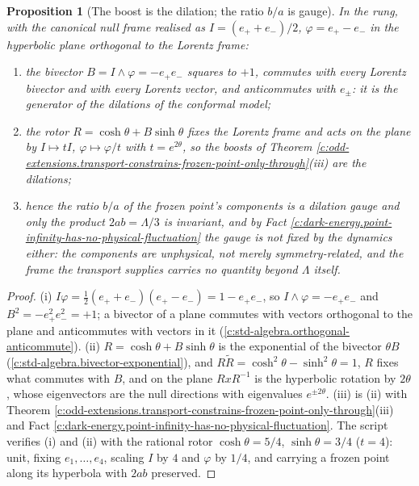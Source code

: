 \documentclass[11pt]{article}
\newtheorem{proposition}[theorem]{Proposition}
\theoremstyle{definition}
\theoremstyle{plain}
\newcommand{\changedmark}[2]{\marginpar{\raggedright\scriptsize\color{#1}#2}}
\begin{document}
\begin{proposition}[The boost is the dilation; the ratio $b/a$ is gauge]\label{c:odd-extensions.boost-dilation-ratio-gauge}
\changedmark{gray}{reworded}
In the rung, with the canonical null frame realised as $I = (e_{+} + e_{-})/2$, $\varphi = e_{+} - e_{-}$ in the hyperbolic plane orthogonal to the Lorentz frame:
\begin{enumerate}
\item[(i)] the bivector $B = I \wedge \varphi = -e_{+}e_{-}$ squares to $+1$, commutes with every Lorentz bivector and with every Lorentz vector, and anticommutes with $e_{\pm}$: it is the generator of the dilations of the conformal model;
\item[(ii)] the rotor $R = \cosh\theta + B\sinh\theta$ fixes the Lorentz frame and acts on the plane by $I \mapsto tI$, $\varphi \mapsto \varphi/t$ with $t = e^{2\theta}$, so the boosts of Theorem \ref{c:odd-extensions.transport-constrains-frozen-point-only-through}(iii) are the dilations;
\item[(iii)] hence the ratio $b/a$ of the frozen point's components is a dilation gauge and only the product $2ab = \Lambda/3$ is invariant, and by Fact \ref{c:dark-energy.point-infinity-has-no-physical-fluctuation} the gauge is not fixed by the dynamics either: the components are unphysical, not merely symmetry-related, and the frame the transport supplies carries no quantity beyond $\Lambda$ itself.
\end{enumerate}
\end{proposition}
\begin{proof}
(i) $I\varphi = \tfrac12(e_{+} + e_{-})(e_{+} - e_{-}) = 1 - e_{+}e_{-}$, so $I \wedge \varphi = -e_{+}e_{-}$ and $B^{2} = -e_{+}^{2}e_{-}^{2} = +1$; a bivector of a plane commutes with vectors orthogonal to the plane and anticommutes with vectors in it (\ref{c:std-algebra.orthogonal-anticommute}). (ii) $R = \cosh\theta + B\sinh\theta$ is the exponential of the bivector $\theta B$ (\ref{c:std-algebra.bivector-exponential}), and $R\tilde R = \cosh^{2}\theta - \sinh^{2}\theta = 1$, $R$ fixes what commutes with $B$, and on the plane $RxR^{-1}$ is the hyperbolic rotation by $2\theta$, whose eigenvectors are the null directions with eigenvalues $e^{\pm 2\theta}$. (iii) is (ii) with Theorem \ref{c:odd-extensions.transport-constrains-frozen-point-only-through}(iii) and Fact \ref{c:dark-energy.point-infinity-has-no-physical-fluctuation}. The script verifies (i) and (ii) with the rational rotor $\cosh\theta = 5/4$, $\sinh\theta = 3/4$ ($t = 4$): unit, fixing $e_{1}, \ldots, e_{4}$, scaling $I$ by $4$ and $\varphi$ by $1/4$, and carrying a frozen point along its hyperbola with $2ab$ preserved.

\end{proof}
\end{document}
